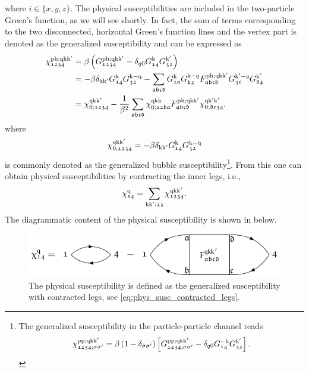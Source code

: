 \documentclass[../../main.tex]{subfiles}
\begin{document}
where $i\in\{x,y,z\}$. The physical susceptibilities are included in the two-particle Green's function, as we will see shortly. In fact, the sum of terms corresponding to the two disconnected, horizontal Green's function lines and the vertex part is denoted as the generalized susceptibility and can be expressed as
\begin{align}\label{eq:generalized_susceptibility}
\begin{split}
	\chi_{\mathfrak{1234}}^{\text{ph};\text{q}\text{k}\text{k}'}&=\beta\left (G_{\mathfrak{1234}}^{\text{ph};\text{q}\text{k}\text{k}'}-\delta_{q0}G_{\mathfrak{14}}^{\text{k}} G_{\mathfrak{32}}^{\text{k}'}\right )\\
	&=-\beta\delta_{\text{k}\text{k}'}G_{\mathfrak{14}}^{\text{k}}G_{\mathfrak{32}}^{\text{k}-\text{q}}-\sum_{\mathfrak{abcd}} G_{\mathfrak{1a}}^{\text{k}} G_{\mathfrak{b2}}^{\text{k}-q} F_{\mathfrak{abcd}}^{\text{ph};\text{q}\text{k}\text{k}'} G_{\mathfrak{3c}}^{\text{k}'-q} G_{\mathfrak{d4}}^{\text{k}'}\\
	&=\chi_{0;\mathfrak{1234}}^{\text{q}\text{k}\text{k}'}-\frac{1}{\beta^2}\sum_{\mathfrak{abcd}}\chi_{0;\mathfrak{12ba}}^{\text{q}\text{k}\text{k}} F_{\mathfrak{abcd}}^{\text{ph};\text{q}\text{k}\text{k}'} \chi_{0;\mathfrak{dc34}}^{\text{q}\text{k}'\text{k}'},
\end{split}
\end{align}
where
\begin{align}
	\chi_{0;\mathfrak{1234}}^{\text{q}\text{k}\text{k}'}=-\beta\delta_{\text{k}\text{k}'}G_{\mathfrak{14}}^{\text{k}}G_{\mathfrak{32}}^{\text{k}-\text{q}}
\end{align}
is commonly denoted as the generalized bubble susceptibility\footnote{The generalized susceptibility in the particle-particle channel reads
\begin{align}\label{eq:generalized_susceptibility_pp_ssp}
	\chi_{\mathfrak{1234};\sigma\sigma'}^{\text{pp};\text{q}\text{k}\text{k}'}=\beta\left (1-\delta_{\sigma\sigma'}\right )\left [G_{\mathfrak{1234};\sigma\sigma'}^{\text{pp};\text{q}\text{k}\text{k}'}-\delta_{q0}G_{\mathfrak{14}}^{-\text{k}} G_{\mathfrak{32}}^{\text{k}'}\right ].
\end{align}
}. From this one can obtain physical susceptibilities by contracting the inner legs, i.e.,
\begin{align}\label{eq:phys_susc_contracted_legs}
	\chi_{\mathfrak{14}}^{\text{q}}=\sum_{\text{k}\text{k}';\mathfrak{23}}\chi_{\mathfrak{1234}}^{\text{q}\text{k}\text{k}'}.
\end{align}
The diagrammatic content of the physical susceptibility is shown in  below.
\begin{figure}[ht!]
	\centering
	\includegraphics[scale=1.2]{Graphics/Diagrams/physical_susceptibility/physical_susceptibility}
	\caption{The physical susceptibility is defined as the generalized susceptibility with contracted legs, see \eqref{eq:phys_susc_contracted_legs}.}
	\label{fig:physical_susceptibility}
\end{figure}
\end{document}
